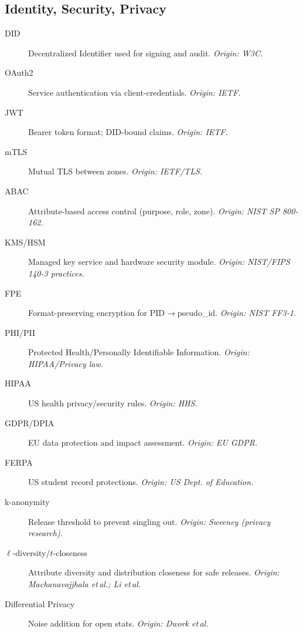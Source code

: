 \documentclass[11pt]{article}
\theoremstyle{plain}
\begin{document}
\subsection*{Identity, Security, Privacy}
\begin{description}
  \item[DID] Decentralized Identifier used for signing and audit. \emph{Origin: W3C.}
  \item[OAuth2] Service authentication via client-credentials. \emph{Origin: IETF.}
  \item[JWT] Bearer token format; DID-bound claims. \emph{Origin: IETF.}
  \item[mTLS] Mutual TLS between zones. \emph{Origin: IETF/TLS.}
  \item[ABAC] Attribute-based access control (purpose, role, zone). \emph{Origin: NIST SP 800-162.}
  \item[KMS/HSM] Managed key service and hardware security module. \emph{Origin: NIST/FIPS 140-3 practices.}
  \item[FPE] Format-preserving encryption for PID$\rightarrow$pseudo\_id. \emph{Origin: NIST FF3-1.}
  \item[PHI/PII] Protected Health/Personally Identifiable Information. \emph{Origin: HIPAA/Privacy law.}
  \item[HIPAA] US health privacy/security rules. \emph{Origin: HHS.}
  \item[GDPR/DPIA] EU data protection and impact assessment. \emph{Origin: EU GDPR.}
  \item[FERPA] US student record protections. \emph{Origin: US Dept. of Education.}
  \item[k-anonymity] Release threshold to prevent singling out. \emph{Origin: Sweeney (privacy research).}
  \item[$\ell$-diversity/$t$-closeness] Attribute diversity and distribution closeness for safe releases. \emph{Origin: Machanavajjhala et\,al.; Li et\,al.}
  \item[Differential Privacy] Noise addition for open stats. \emph{Origin: Dwork et\,al.}
\end{description}
\end{document}
